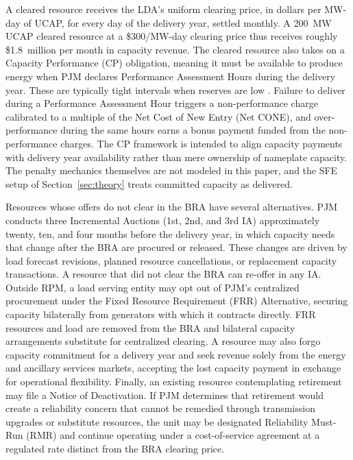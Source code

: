A cleared resource receives the LDA's uniform clearing price, in
dollars per MW-day of UCAP, for every day of the
delivery year, settled monthly. A 200~MW UCAP cleared resource at a
\$300/MW-day clearing price thus receives roughly \$1.8~million per
month in capacity revenue. The cleared resource also takes on a
Capacity Performance (CP) obligation, meaning it must be available
to produce energy when PJM declares Performance Assessment Hours
during the delivery year. These are typically tight intervals when
reserves are low \citep{PJM_Manual18}. Failure to deliver during a
Performance Assessment Hour triggers a non-performance charge
calibrated to a multiple of the Net Cost of New Entry (Net CONE), and over-performance during
the same hours earns a bonus payment funded from the
non-performance charges. The CP framework is intended to align
capacity payments with delivery year availability rather than mere
ownership of nameplate capacity. The penalty mechanics themselves
are not modeled in this paper, and the SFE setup of
Section~\ref{sec:theory} treats committed capacity as delivered.

Resources whose offers do not clear in the BRA have several
alternatives. PJM conducts three Incremental Auctions (1st, 2nd,
and 3rd IA) approximately twenty, ten, and four months before the
delivery year, in which capacity needs that change after the BRA are
procured or released. These changes are driven by load forecast
revisions, planned resource cancellations, or replacement capacity
transactions. A resource that did not clear the BRA can re-offer in
any IA. Outside RPM, a load serving entity may opt out of PJM's
centralized procurement under the Fixed Resource Requirement (FRR)
Alternative, securing capacity bilaterally from generators with which
it contracts directly. FRR resources and load are removed from the
BRA and bilateral capacity arrangements substitute for centralized
clearing. A resource may also forgo capacity commitment for a
delivery year and seek revenue solely from the energy and
ancillary services markets, accepting the lost capacity payment in
exchange for operational flexibility. Finally, an existing resource
contemplating retirement may file a Notice of Deactivation. If PJM
determines that retirement would create a reliability concern that
cannot be remedied through transmission upgrades or substitute
resources, the unit may be designated Reliability Must-Run (RMR) and
continue operating under a cost-of-service agreement at a regulated
rate distinct from the BRA clearing price.

